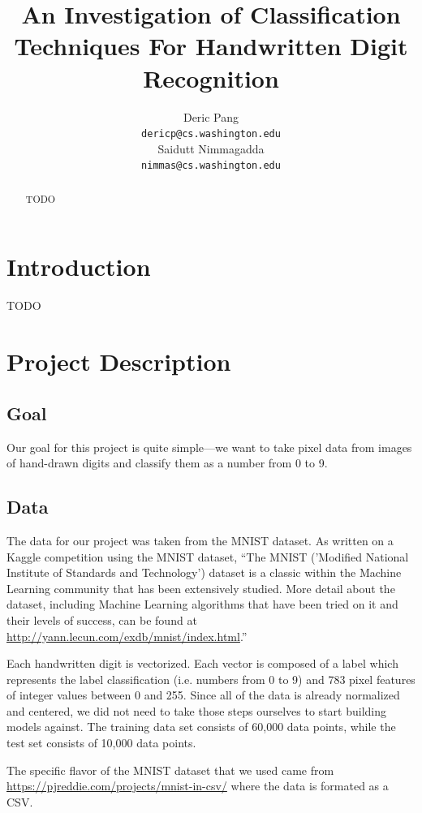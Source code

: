 \documentclass{article} %
\title{An Investigation of Classification Techniques For Handwritten Digit Recognition}
\author{
Deric Pang \\
\texttt{dericp@cs.washington.edu} \\
\And
Saidutt Nimmagadda \\
\texttt{nimmas@cs.washington.edu} \\
}
\begin{document}
\maketitle

\begin{abstract}
  TODO
\end{abstract}

\section{Introduction}
TODO

\section{Project Description}
\subsection{Goal}

Our goal for this project is quite simple---we want to
take pixel data from images of hand-drawn digits
and classify them as a number from 0 to 9.

\subsection{Data}

The data for our project was taken from the MNIST dataset. As written on a
Kaggle competition using the MNIST dataset, ``The MNIST
('Modified National Institute of Standards and Technology') dataset
is a classic within the Machine Learning community that has been extensively
studied. More detail about the dataset, including Machine Learning algorithms
that have been tried on it and their levels of success, can be found at
\href{http://yann.lecun.com/exdb/mnist/index.html}{http://yann.lecun.com/exdb/mnist/index.html}.''

Each handwritten digit is vectorized. Each vector is composed of a label which
represents the label classification (i.e. numbers from 0 to 9) and 783 pixel
features of integer values between 0 and 255. Since all
of the data is already normalized and centered, we did not need to take those
steps ourselves to start building models against. The training data set
consists of 60,000 data points, while the test set consists of 10,000 data
points.

The specific flavor of the MNIST dataset that we used came from
\href{https://pjreddie.com/projects/mnist-in-csv/}{https://pjreddie.com/projects/mnist-in-csv/}
where the data is formated as a CSV.
\end{document}
